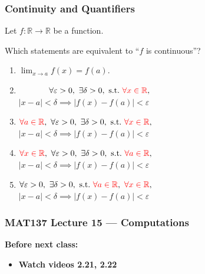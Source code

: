 \documentclass[14pt]{beamer}
\newcommand {\DS} [1] {${\displaystyle #1}$}
\newcommand{\rojo}[1]{{\color{red} #1}}
\begin{document}
\begin{frame}[t]
	\frametitle{Continuity and Quantifiers}
	Let $f:\mathbb R\to\mathbb R$ be a function.

	\small
	\medskip
	Which statements are equivalent to ``$f$ is continuous''?

	\begin{enumerate}
		\item \DS{\lim_{x\to a} f(x)=f(a)}.

		
			\vfill
		\item 
			$\phantom{\forall a\in \mathbb R,\ }\forall \varepsilon>0,\ \exists\delta >0,\ \text{s.t.}\ \rojo{\forall x\in\mathbb R},$\\
			$|x-a|<\delta\implies |f(x)-f(a)|<\varepsilon$
			\vfill
		\item 
			$\rojo{\forall a\in \mathbb R},\ \forall \varepsilon>0,\ \exists\delta >0,\ \text{s.t.}\ \rojo{\forall x\in\mathbb R},$\\
			$|x-a|<\delta\implies |f(x)-f(a)|<\varepsilon$
			\vfill
		\item 
			$\rojo{\forall x\in \mathbb R},\ \forall \varepsilon>0,\ \exists\delta >0,\ \text{s.t.}\ \rojo{\forall a\in\mathbb R},$\\
			$|x-a|<\delta\implies |f(x)-f(a)|<\varepsilon$
			\vfill
		\item 
			$\forall \varepsilon>0,\ \exists\delta >0,\ \text{s.t.}\ \rojo{\forall a\in \mathbb R},\ \rojo{\forall x\in\mathbb R},$\\
			$|x-a|<\delta\implies |f(x)-f(a)|<\varepsilon$
			\vfill
	\end{enumerate}
			\vfill
	
\end{frame}


\begin{frame}
\frametitle{MAT137 Lecture 15 --- Computations}
	{\bf Before next class:}
		\begin{itemize} \normalsize
			\item {\bf Watch videos 2.21, 2.22 }
		\end{itemize}
	\vfill

\end{frame}
\end{document}
